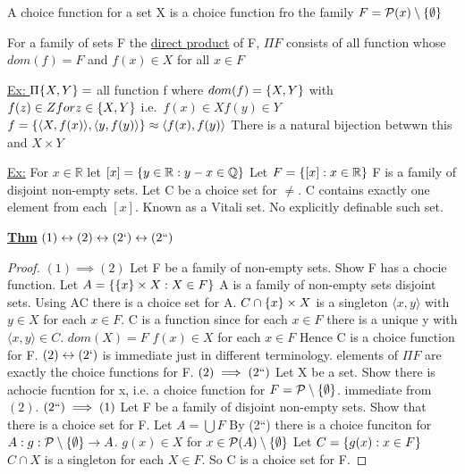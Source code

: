 \dfn A choice function for a set X is a choice function fro the family $F = \mathcal{P}(x) \setminus\{\emptyset\}$

\dfn For a family of sets F the \underline{direct product} of F, $\Pi F$ consists of all function whose $dom(f) = F$ and $f(x) \in X$ for all $x \in F$

\underline{Ex: } $\Pi \{X, Y\} = $ all function f where $dom(f) = \{X,Y\}$ with $f(z) \in Z for z \in \{X,Y\}$
i.e.\ $f(x) \in X f(y) \in Y$
$f = \{\langle X, f(x) \rangle,\langle y, f(y) \rangle\} \approx \langle f(x), f(y) \rangle$
There is a natural bijection betwwn this and $X \times Y$

\newcommand{\RR}{\mathbb R}

\underline{Ex:} For $x \in \RR$ let $[x] = \set{y \in \RR : y-x \in \mathbb{Q}}$
Let $F = \set{[x] : x \in \RR}$
F is a family of disjoint non-empty sets.
Let C be a choice set for $\neq$.
C contains exactly one element from each $[x]$.
Known as a Vitali set.
No explicitly definable such set.

\textbf{\underline{Thm}} $(1) \leftrightarrow (2) \leftrightarrow (2`) \leftrightarrow (2``)$
\begin{proof}
$(1) \implies (2)$ Let F be a family of non-empty sets.
    Show F has a chocie function.
    Let $A = \{\{x\} \times X : X \in F\}$
    A is a family of non-empty sets disjoint sets.
    Using AC there is a choice set for A.
    $C \cap \{x\}\times X$ is a singleton $\langle x, y \rangle$ with $y \in X$ for each $x \in F$.
    C is a function since for each $x \in F$ there is a unique y with $\langle x, y \rangle \in C$.
    $dom(X) = F$
    $f(x) \in X$ for each $x \in F$
    Hence C is a choice function for F.
$(2) \leftrightarrow (2`)$ is immediate just in different terminology.
    elements of $\Pi F$ are exactly the choice functions for F.
$(2) \implies (2``)$ Let X be a set.
    Show there is achocie fucntion for x, i.e. a choice function for $F = \mathcal{P} \setminus \{\emptyset\}$.
    immediate from $(2)$.
$(2``) \implies (1)$ Let F be a family of disjoint non-empty sets.
    Show that there is a choice set for F.
    Let $A = \bigcup F$
    By (2``) there is a choice funciton for $A: g : \mathcal{P}\setminus \{\emptyset\} \rightarrow A$.
    $g(x) \in X$ for $x \in \mathcal{P}(A)\setminus \{\emptyset\}$
    Let $C = \{g(x) : x \in F\}$
    $C \cap X$ is a singleton for each $X \in F$.
    So C is a choice set for F.
\end{proof}


